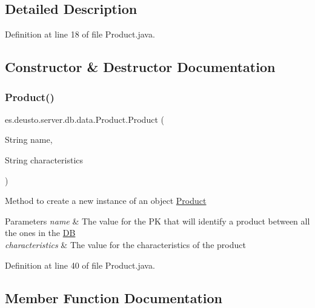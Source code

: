 \subsection{Detailed Description}


Definition at line 18 of file Product.\+java.



\subsection{Constructor \& Destructor Documentation}
\mbox{\label{classes_1_1deusto_1_1server_1_1db_1_1data_1_1_product_a8c697db6ce4cede760ae565dfde3ac3e}} 
\subsubsection{\texorpdfstring{Product()}{Product()}}
{\footnotesize\ttfamily es.\+deusto.\+server.\+db.\+data.\+Product.\+Product (\begin{DoxyParamCaption}\item[{String}]{name,  }\item[{String}]{characteristics }\end{DoxyParamCaption})}

Method to create a new instance of an object \hyperlink{classes_1_1deusto_1_1server_1_1db_1_1data_1_1_product}{Product} 
\begin{DoxyParams}{Parameters}
{\em name} & The value for the PK that will identify a product between all the ones in the \hyperlink{classes_1_1deusto_1_1server_1_1db_1_1_d_b}{DB} \\
\hline
{\em characteristics} & The value for the characteristics of the product \\
\hline
\end{DoxyParams}


Definition at line 40 of file Product.\+java.



\subsection{Member Function Documentation}
\mbox{\label{classes_1_1deusto_1_1server_1_1db_1_1data_1_1_product_a2e60d68bada56d93ec2ef5e67a0c3d9f}} 
